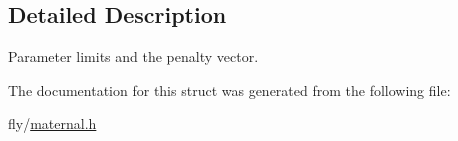 \subsection{Detailed Description}
Parameter limits and the penalty vector. 

The documentation for this struct was generated from the following file:\begin{DoxyCompactItemize}
\item 
fly/\hyperlink{maternal_8h}{maternal.h}\end{DoxyCompactItemize}
